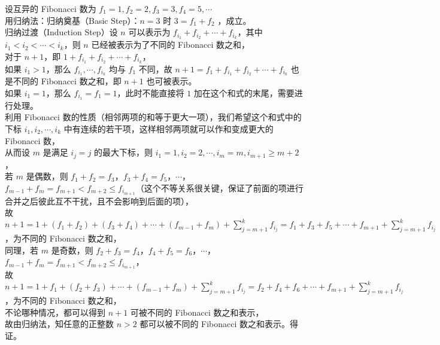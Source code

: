 \documentclass{ctexbook}
\begin{document}
\begin{enumerate}
    设互异的 Fibonacci 数为 $f_1=1,f_2=2,f_3=3,f_4=5,\cdots$ \\
    用归纳法：归纳奠基（Basic Step）：$n=3$ 时 $3=f_1+f_2$ ，成立。\\
    归纳过渡（Induction Step）设 $n$ 可以表示为 $f_{i_1}+f_{i_2}+\cdots+f_{i_k}$，其中 $i_1<i_2<\cdots<i_k$，则 $n$ 已经被表示为了不同的 Fibonacci 数之和，\\
    对于 $n+1$，即 $1+f_{i_1}+f_{i_2}+\cdots+f_{i_k}$，\\
    如果 $i_1>1$，那么 $f_{i_1},\cdots,f_{i_k}$ 均与 $f_1$ 不同，故 $n+1=f_1+f_{i_1}+f_{i_2}+\cdots+f_{i_k}$ 也是不同的 Fibonacci 数之和，即 $n+1$ 也可被表示。 \\
    如果 $i_1=1$，那么 $f_{i_1}=f_1=1$，此时不能直接将 $1$ 加在这个和式的末尾，需要进行处理。\\
    利用 Fibonacci 数的性质（相邻两项的和等于更大一项），我们希望这个和式中的下标 $i_1,i_2,\cdots,i_k$ 中有连续的若干项，这样相邻两项就可以作和变成更大的 Fibonacci 数，\\
    从而设 $m$ 是满足 $i_j=j$ 的最大下标，则 $i_1=1,i_2=2,\cdots,i_m=m,i_{m+1}\geq m+2$，\\
    若 $m$ 是偶数，则 $f_1+f_2=f_3$，$f_3+f_4=f_5$，$\cdots$，$f_{m-1}+f_m=f_{m+1}<f_{m+2}\leq f_{i_{m+1}}$（这个不等关系很关键，保证了前面的项进行合并之后彼此互不干扰，且不会影响到后面的项），\\
    故 $n+1=1+(f_1+f_2)+(f_3+f_4)+\cdots+(f_{m-1}+f_m)+\displaystyle\sum_{j=m+1}^k f_{i_j}=f_1+f_3+f_5+\cdots+f_{m+1}+\displaystyle\sum_{j=m+1}^k f_{i_j}$，为不同的 Fibonacci 数之和，\\
    同理，若 $m$ 是奇数，则 $f_2+f_3=f_4$，$f_4+f_5=f_6$，$\cdots$，$f_{m-1}+f_m=f_{m+1}<f_{m+2}\leq f_{i_{m+1}}$，\\
    故 $n+1=1+f_1+(f_2+f_3)+\cdots+(f_{m-1}+f_m)+\displaystyle\sum_{j=m+1}^k f_{i_j}=f_2+f_4+f_6+\cdots+f_{m+1}+\displaystyle\sum_{j=m+1}^k f_{i_j}$，为不同的 Fibonacci 数之和，\\
    不论哪种情况，都可以得到 $n+1$ 可被不同的 Fibonacci 数之和表示，\\
    故由归纳法，知任意的正整数 $n>2$ 都可以被不同的 Fibonacci 数之和表示。得证。
\end{enumerate}
\end{document}

